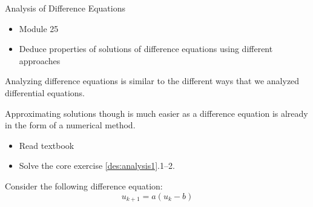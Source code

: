 %
%



\begin{module}{Analysis of Difference Equations}
	\label{diff:analysis}

	
	
\end{module}



\begin{lesson}

	\begin{itemize}
		\item Module 25
	\end{itemize}

	\begin{itemize}
		\item Deduce properties of solutions of difference equations using different approaches
	\end{itemize}
	


Analyzing difference equations is similar to the different ways that we analyzed differential equations.

Approximating solutions though is much easier as a difference equation is already in the form of a numerical method.

\begin{itemize}
	\item Read textbook
	\item Solve the core exercise \ref{des:analysis1}.1--2.
\end{itemize}

\end{lesson}




\question \label{des:analysis1}
	Consider the following difference equation:
		$$u_{k+1} = a(u_k - b)$$

